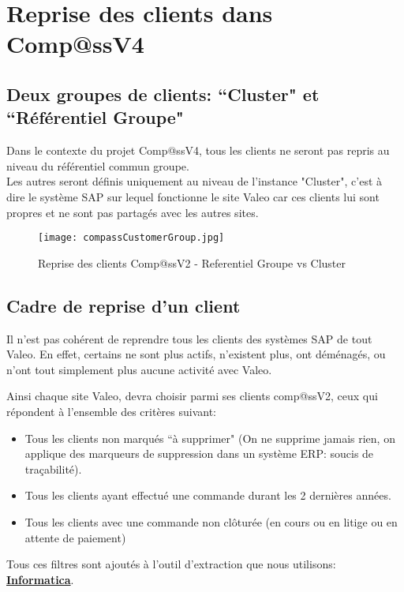 \section{Reprise des clients dans Comp@ssV4}

\subsection{Deux groupes de clients: ``Cluster" et ``Référentiel Groupe"}

Dans le contexte du projet Comp@ssV4, tous les clients ne seront pas repris au niveau du référentiel commun groupe.\\
Les autres seront définis uniquement au niveau de l'instance "Cluster", c'est à dire le système SAP sur lequel fonctionne le site Valeo car ces clients lui sont propres et ne sont pas partagés avec les autres sites.
\begin{figure}[H]
    \centering
    \texttt{[image: compassCustomerGroup.jpg]}
	\caption{Reprise des clients Comp@ssV2 - Referentiel Groupe vs Cluster}\label{image.compassCustomerGroup} 
\end{figure}

\subsection{Cadre de reprise d'un client}
Il n'est pas cohérent de reprendre tous les clients des systèmes SAP de tout Valeo. En effet, certains ne sont plus actifs, n'existent plus, ont déménagés, ou n'ont tout simplement plus aucune activité avec Valeo.

Ainsi chaque site Valeo, devra choisir parmi ses clients comp@ssV2, ceux qui répondent à l'ensemble des critères suivant:

\begin{itemize}\itemsep4pt
	\item Tous les clients non marqués ``à supprimer" (On ne supprime jamais rien, on applique des marqueurs de suppression dans un système ERP: soucis de traçabilité).
	\item Tous les clients ayant effectué une commande durant les 2 dernières années.
	\item Tous les clients avec une commande non clôturée (en cours ou en litige ou en attente de paiement)
\end{itemize}

Tous ces filtres sont ajoutés à l'outil d'extraction que nous utilisons: \href{http://www.informatica.com/us/SAP/}{\textbf{Informatica}}.


